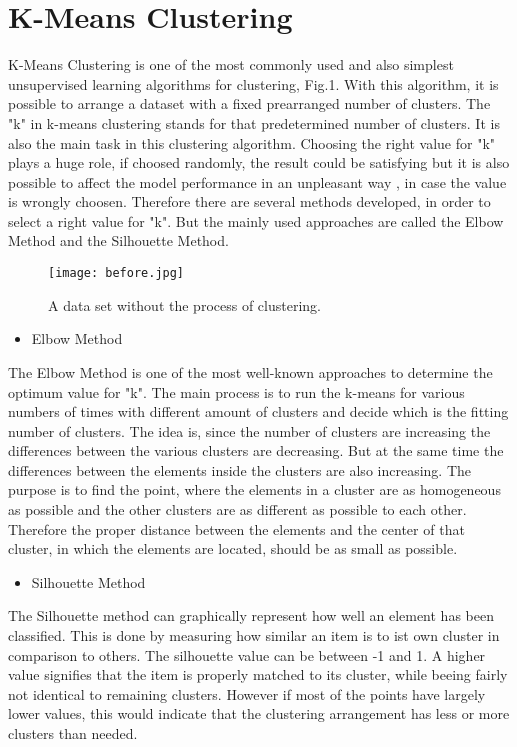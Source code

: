 \documentclass[conference]{IEEEtran}
\begin{document}
\section{K-Means Clustering}

K-Means Clustering is one of the most commonly used and also simplest unsupervised learning algorithms for clustering, Fig.1. With this algorithm, it is possible to arrange a dataset with a fixed prearranged number of clusters. The "k" in k-means clustering stands for that predetermined number of clusters. It is also the main task in this clustering algorithm. Choosing the right value for "k" plays a huge role, if choosed randomly, the result could be satisfying but it is also possible to affect the model performance in an unpleasant way , in case the value is wrongly choosen. Therefore there are several methods developed, in order to select a right value for "k". But the mainly used approaches are called the Elbow Method and the Silhouette Method.

\begin{figure}[htbp]
\centerline{\texttt{[image: before.jpg]}}
\caption{A data set without the process of clustering.}
\label{fig}
\end{figure}
\begin{itemize}

  \item Elbow Method
\end{itemize}
The Elbow Method is one of the most well-known approaches to determine the optimum value for "k". The main process is to run the k-means for various numbers of times with different amount of clusters and decide which is the fitting number of clusters. The idea is, since the number of clusters are increasing the differences between the various clusters are decreasing. But at the same time the differences between the elements inside the clusters are also increasing. The purpose is to find the point, where the elements in a cluster are as homogeneous as possible and the other clusters are as different as possible to each other. Therefore the proper distance between the elements and the center of that cluster, in which the elements are located, should be as small as possible.  

\begin{itemize}
  \item Silhouette Method
\end{itemize}
The Silhouette method can graphically represent how well an element has been classified.  This is done by measuring how similar an item is to ist own cluster in comparison to others. The silhouette value can be between -1 and 1. A higher value signifies that the item is properly matched to its cluster, while beeing fairly not identical to remaining clusters. However if most of the points have largely lower values, this would indicate that the clustering arrangement has less or more clusters than needed.
\end{document}
